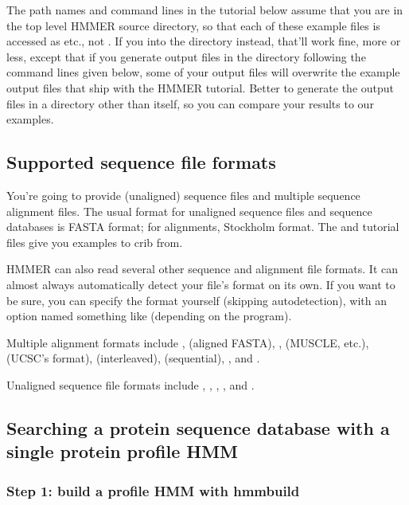 The path names and command lines in the tutorial below assume that you
are in the top level HMMER source directory, so that each of these
example files is accessed as  etc., not
.  If you  into the 
directory instead, that'll work fine, more or less, except that if you
generate output files in the  directory following the
command lines given below, some of your output files will overwrite
the example output files that ship with the HMMER tutorial. Better to
generate the output files in a directory other than 
itself, so you can compare your results to our examples.


\subsection{Supported sequence file formats}

You're going to provide (unaligned) sequence files and multiple
sequence alignment files. The usual format for unaligned sequence
files and sequence databases is FASTA format; for alignments,
Stockholm format. The  and  tutorial files give
you examples to crib from. 

HMMER can also read several other sequence and alignment file formats.
It can almost always automatically detect your file's format on its
own. If you want to be sure, you can specify the format yourself
(skipping autodetection), with an option named something like
 (depending on the program). 

Multiple alignment formats include , 
(aligned FASTA), ,  (MUSCLE, etc.),
 (UCSC's format),  (interleaved),
 (sequential), , and .

Unaligned sequence file formats include ,
, , , and .
 


\subsection{Searching a protein sequence database with a single protein profile HMM}


\subsubsection{Step 1: build a profile HMM with hmmbuild}

